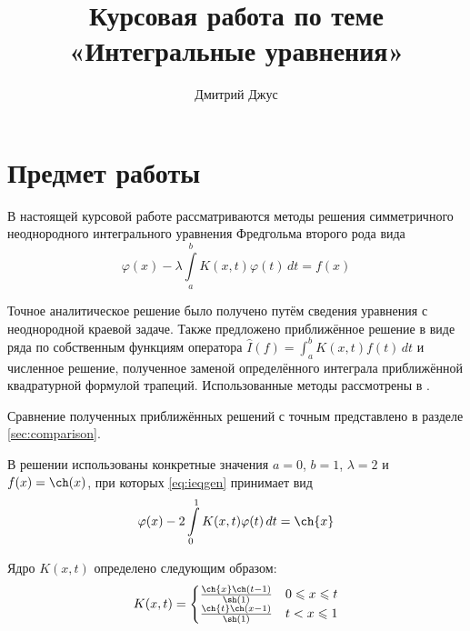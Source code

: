 \documentclass{article}
\numberwithin{equation}{section}
\renewcommand{\phi}{\varphi}
\renewcommand{\leq}{\leqslant}
\newcommand{\intl}{\int\limits}
\begin{document}
\author{Дмитрий Джус}
\title{Курсовая работа по теме \\
  \Huge{«Интегральные уравнения»}}
\pretitle{\begin{center}\LARGE}
  \posttitle{\par\end{center}\vskip 3pc}
\date{}
\maketitle
\thispagestyle{empty}

\clearpage
\tableofcontents

\clearpage
\section{Предмет работы}
\label{sec:problem}
В настоящей курсовой работе рассматриваются методы решения
симметричного неоднородного интегрального уравнения Фредгольма второго
рода вида
\begin{equation}
  \label{eq:ieqgen}
  \phi(x) - \lambda \intl_a^b {K(x, t) \phi(t)\,dt} = f(x)
\end{equation}

Точное аналитическое решение было получено путём сведения уравнения с
неоднородной краевой задаче. Также предложено приближённое решение в
виде ряда по собственным функциям оператора $\hat{I}(f) =
\int_a^b{K(x, t) f(t)\, dt}$ и численное решение, полученное заменой
определённого интеграла приближённой квадратурной формулой трапеций.
Использованные методы рассмотрены в \cite{polyanin03}.

Сравнение полученных приближённых решений с точным представлено в
разделе \ref{sec:comparison}.

В решении использованы конкретные значения $a=0$, $b=1$, $\lambda = 2$
и $f(x) = \ch(x)$, при которых \eqref{eq:ieqgen} принимает вид
\begin{equation}
  \label{eq:ieq}
  \phi(x) - 2 \intl_0^1 {K(x, t) \phi(t)\,dt} = \ch{x}
\end{equation}

Ядро $K(x,t)$ определено следующим образом:
\begin{equation}
  \label{eq:kernel}
  K(x, t) = 
  \begin{cases}
    \frac{\ch{x} \ch(t-1)}{\sh(1)} & 0 \leq x \leq t\\
    \frac{\ch{t} \ch(x-1)}{\sh(1)} & t < x \leq 1
  \end{cases}
\end{equation}
\end{document}
